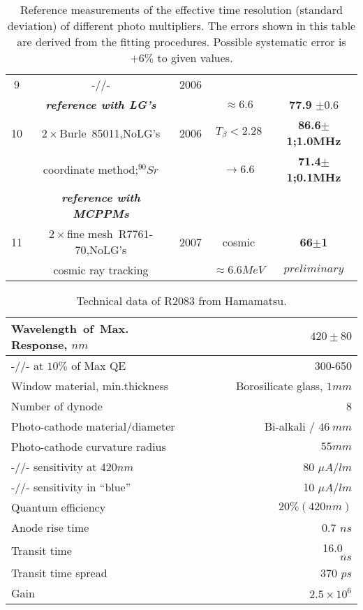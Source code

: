 \begin{table}[ht]
\begin{center}
\begin{tabular}{|c|c|c|c|c|}
9&-//-& 2006 & &                       \\
 & \textbf{\textit{reference with LG's}}    &      &    $\approx6.6$  &   \textbf{77.9} $\pm0.6$        \\  \hline


10&$2\times$Burle~85011,NoLG's      & 2006 &$T_{\beta}<2.28$ &    \textbf{86.6$\pm$1;1.0MHz}\\ 
 &coordinate method;$^{90}Sr$&      &$\rightarrow6.6$     & \textbf{71.4$\pm$1;0.1MHz}             \\ 
&\textbf{\textit{reference with MCPPMs}}&      &   &              \\ \hline

11&$2\times$fine mesh~R7761-70,NoLG's  & 2007 &cosmic &    \textbf{66$\pm$1}\\ 
 &cosmic ray tracking   &      &$\approx6.6MeV$     &     $preliminary$         \\ \hline
\hline
\end{tabular}
\caption{Reference measurements of the effective time 
resolution (standard deviation) of different photo multipliers.  
The errors shown in this table are derived from the 
fitting procedures. Possible systematic error is $+6\%$ 
to given values.\label{crt}}
\end{center}
\end{table}


\begin{table}[htbp]
\begin{center}
\begin{tabular}{|l|r|} \hline
Wavelength~of~Max. Response, $nm$  &      $420\pm80$ \\\hline
-//- at  $10\%$ of Max QE                & 300-650 \\\hline
Window material, min.thickness &   Borosilicate glass, $1mm$ \\\hline
Number of dynode   &   8\\\hline
Photo-cathode material/diameter & Bi-alkali / $46~mm$\\\hline
Photo-cathode curvature radius &   $55 mm $\\\hline
-//- sensitivity at 420$nm$   &  80 $\mu A/lm$ \\\hline
-//- sensitivity in  ``blue''&  10 $\mu A/lm$\\\hline
Quantum efficiency & $20\%(420nm)$\\\hline
Anode rise time&~~~~~~~~~~~~~~~~~~~~0.7 $ns$\\\hline
Transit time &~~~~~~~~~~~~~~~~~~~~~~16.0 ~$ns$\\\hline
Transit time spread&~~~~~~~~~~~~~~~~370 $ps$\\ \hline
Gain & $2.5 \times 10^6$ \\ \hline
\end{tabular}
\end{center}
\caption{Technical data of R2083 from Hamamatsu.\label{table1}}
\end{table}

